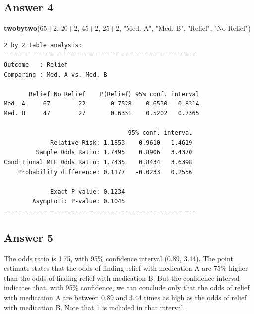 \documentclass[
]{book}
\newenvironment{Shaded}{\begin{snugshade}}{\end{snugshade}}
\newcommand{\DecValTok}[1]{\textcolor[rgb]{0.00,0.00,0.81}{#1}}
\newcommand{\KeywordTok}[1]{\textcolor[rgb]{0.13,0.29,0.53}{\textbf{#1}}}
\newcommand{\NormalTok}[1]{#1}
\newcommand{\OperatorTok}[1]{\textcolor[rgb]{0.81,0.36,0.00}{\textbf{#1}}}
\newcommand{\StringTok}[1]{\textcolor[rgb]{0.31,0.60,0.02}{#1}}
\begin{document}
\hypertarget{answer-4}{%
\subsection{Answer 4}\label{answer-4}}

\begin{Shaded}
\begin{Highlighting}[]
\KeywordTok{twobytwo}\NormalTok{(}\DecValTok{65}\OperatorTok{+}\DecValTok{2}\NormalTok{, }\DecValTok{20}\OperatorTok{+}\DecValTok{2}\NormalTok{, }\DecValTok{45}\OperatorTok{+}\DecValTok{2}\NormalTok{, }\DecValTok{25}\OperatorTok{+}\DecValTok{2}\NormalTok{, }\StringTok{"Med. A"}\NormalTok{, }\StringTok{"Med. B"}\NormalTok{, }\StringTok{"Relief"}\NormalTok{, }\StringTok{"No Relief"}\NormalTok{)}
\end{Highlighting}
\end{Shaded}

\begin{verbatim}
2 by 2 table analysis: 
------------------------------------------------------ 
Outcome   : Relief 
Comparing : Med. A vs. Med. B 

       Relief No Relief    P(Relief) 95% conf. interval
Med. A     67        22       0.7528    0.6530   0.8314
Med. B     47        27       0.6351    0.5202   0.7365

                                   95% conf. interval
             Relative Risk: 1.1853    0.9610   1.4619
         Sample Odds Ratio: 1.7495    0.8906   3.4370
Conditional MLE Odds Ratio: 1.7435    0.8434   3.6398
    Probability difference: 0.1177   -0.0233   0.2556

             Exact P-value: 0.1234 
        Asymptotic P-value: 0.1045 
------------------------------------------------------
\end{verbatim}

\hypertarget{answer-5}{%
\subsection{Answer 5}\label{answer-5}}

The odds ratio is 1.75, with 95\% confidence interval (0.89, 3.44). The point estimate states that the odds of finding relief with medication A are 75\% higher than the odds of finding relief with medication B. But the confidence interval indicates that, with 95\% confidence, we can conclude only that the odds of relief with medication A are between 0.89 and 3.44 times as high as the odds of relief with medication B. Note that 1 is included in that interval.
\end{document}
